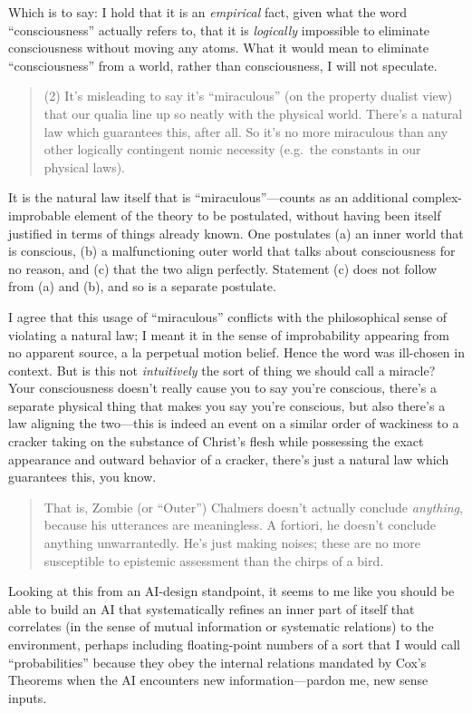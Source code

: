 {
 Which is to say: I hold that it is an \textit{empirical} fact,
given what the word
``consciousness'' actually refers
to, that it is \textit{logically} impossible to eliminate consciousness
without moving any atoms. What it would mean to eliminate
``consciousness'' from a world,
rather than consciousness, I will not speculate.}

\begin{quote}
{
 (2) It's misleading to say it's
``miraculous'' (on the property
dualist view) that our qualia line up so neatly with the physical
world. There's a natural law which guarantees this,
after all. So it's no more miraculous than any other
logically contingent nomic necessity (e.g.~the constants in our
physical laws).}
\end{quote}

{
 It is the natural law itself that is
``miraculous''---counts as an
additional complex-improbable element of the theory to be postulated,
without having been itself justified in terms of things already known.
One postulates (a) an inner world that is conscious, (b) a
malfunctioning outer world that talks about consciousness for no
reason, and (c) that the two align perfectly. Statement (c) does not
follow from (a) and (b), and so is a separate postulate.}

{
 I agree that this usage of
``miraculous'' conflicts with the
philosophical sense of violating a natural law; I meant it in the sense
of improbability appearing from no apparent source, a la perpetual
motion belief. Hence the word was ill-chosen in context. But is this
not \textit{intuitively} the sort of thing we should call a miracle?
Your consciousness doesn't really cause you to say
you're conscious, there's a separate
physical thing that makes you say you're conscious, but
also there's a law aligning the two---this is indeed an
event on a similar order of wackiness to a cracker taking on the
substance of Christ's flesh while possessing the exact
appearance and outward behavior of a cracker, there's
just a natural law which guarantees this, you know.}

\begin{quote}
{
 That is, Zombie (or ``Outer'')
Chalmers doesn't actually conclude \textit{anything},
because his utterances are meaningless. A fortiori, he
doesn't conclude anything unwarrantedly.
He's just making noises; these are no more susceptible
to epistemic assessment than the chirps of a bird.}
\end{quote}

{
 Looking at this from an AI-design standpoint, it seems to me like
you should be able to build an AI that systematically refines an inner
part of itself that correlates (in the sense of mutual information or
systematic relations) to the environment, perhaps including
floating-point numbers of a sort that I would call
``probabilities'' because they obey
the internal relations mandated by Cox's Theorems when
the AI encounters new information---pardon me, new sense inputs.}


